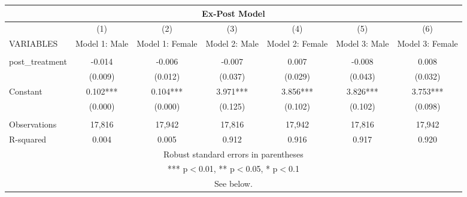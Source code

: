 \begin{tabular}{lcccccc}
\multicolumn{7}{c}{Ex-Post Model} \\ \hline
 & (1) & (2) & (3) & (4) & (5) & (6) \\
VARIABLES & Model 1: Male & Model 1: Female & Model 2: Male & Model 2: Female & Model 3: Male & Model 3: Female \\ \hline
 &  &  &  &  &  &  \\
post\_treatment & -0.014 & -0.006 & -0.007 & 0.007 & -0.008 & 0.008 \\
 & (0.009) & (0.012) & (0.037) & (0.029) & (0.043) & (0.032) \\
Constant & 0.102*** & 0.104*** & 3.971*** & 3.856*** & 3.826*** & 3.753*** \\
 & (0.000) & (0.000) & (0.125) & (0.102) & (0.102) & (0.098) \\
 &  &  &  &  &  &  \\
Observations & 17,816 & 17,942 & 17,816 & 17,942 & 17,816 & 17,942 \\
 R-squared & 0.004 & 0.005 & 0.912 & 0.916 & 0.917 & 0.920 \\ \hline
\multicolumn{7}{c}{ Robust standard errors in parentheses} \\
\multicolumn{7}{c}{ *** p$<$0.01, ** p$<$0.05, * p$<$0.1} \\
\multicolumn{7}{c}{ See below.} \\
\end{tabular}
